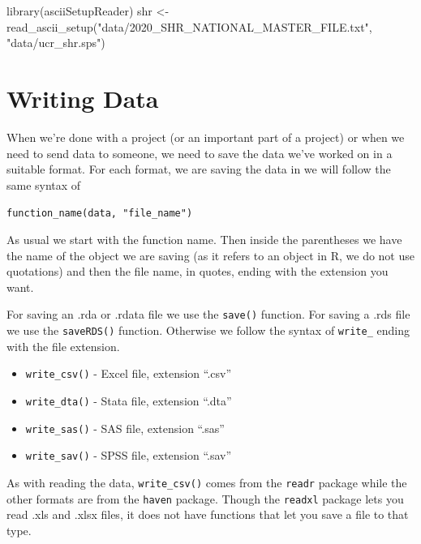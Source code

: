 \documentclass[
]{krantz}
\makeatletter
\newenvironment{Shaded}{\begin{snugshade}}{\end{snugshade}}
\newcommand{\FunctionTok}[1]{\textcolor[rgb]{0,0,0}{#1}}
\newcommand{\NormalTok}[1]{#1}
\newcommand{\OtherTok}[1]{\textcolor[rgb]{0.37,0.37,0.37}{#1}}
\newcommand{\StringTok}[1]{\textcolor[rgb]{0.5,0.5,0.5}{#1}}
\providecommand{\tightlist}{%
  \setlength{\itemsep}{0pt}\setlength{\parskip}{0pt}}
\newenvironment{kframe}{%
\medskip{}
\setlength{\fboxsep}{.8em}
 \def\at@end@of@kframe{}%
 \ifinner\ifhmode%
  \def\at@end@of@kframe{\end{minipage}}%
  \begin{minipage}{\columnwidth}%
 \fi\fi%
 \def\FrameCommand##1{\hskip\@totalleftmargin \hskip-\fboxsep
 \colorbox{shadecolor}{##1}\hskip-\fboxsep
     \hskip-\linewidth \hskip-\@totalleftmargin \hskip\columnwidth}%
 \MakeFramed {\advance\hsize-\width
   \@totalleftmargin\z@ \linewidth\hsize
   \@setminipage}}%
 {\par\unskip\endMakeFramed%
 \at@end@of@kframe}
\renewenvironment{Shaded}{\begin{kframe}}{\end{kframe}}
\makeatother
\begin{document}
\begin{Shaded}
\begin{Highlighting}[]
\FunctionTok{library}\NormalTok{(asciiSetupReader)}
\NormalTok{shr }\OtherTok{\textless{}{-}} \FunctionTok{read\_ascii\_setup}\NormalTok{(}\StringTok{"data/2020\_SHR\_NATIONAL\_MASTER\_FILE.txt"}\NormalTok{, }\StringTok{"data/ucr\_shr.sps"}\NormalTok{)}
\end{Highlighting}
\end{Shaded}

\hypertarget{writing-data}{%
\section{Writing Data}\label{writing-data}}

When we're done with a project (or an important part of a project) or when we need to send data to someone, we need to save the data we've worked on in a suitable format. For each format, we are saving the data in we will follow the same syntax of

\texttt{function\_name(data,\ "file\_name")}

As usual we start with the function name. Then inside the parentheses we have the name of the object we are saving (as it refers to an object in R, we do not use quotations) and then the file name, in quotes, ending with the extension you want.

For saving an .rda or .rdata file we use the \texttt{save()} function. For saving a .rds file we use the \texttt{saveRDS()} function. Otherwise we follow the syntax of \texttt{write\_} ending with the file extension.

\begin{itemize}
\tightlist
\item
  \texttt{write\_csv()} - Excel file, extension ``.csv''
\item
  \texttt{write\_dta()} - Stata file, extension ``.dta''
\item
  \texttt{write\_sas()} - SAS file, extension ``.sas''
\item
  \texttt{write\_sav()} - SPSS file, extension ``.sav''
\end{itemize}

As with reading the data, \texttt{write\_csv()} comes from the \texttt{readr} package while the other formats are from the \texttt{haven} package. Though the \texttt{readxl} package lets you read .xls and .xlsx files, it does not have functions that let you save a file to that type.
\end{document}

